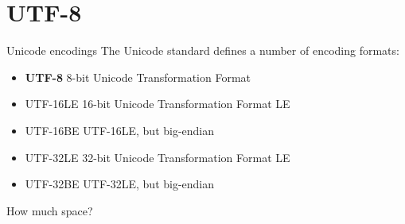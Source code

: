 \documentclass[../index.tex]{subfiles}
\begin{document}
\section{UTF-8}
%

\renewcommand{\currenttitle}{Unicode encodings}
\begin{frame}{\currenttitle}
%
%
%
%
  The Unicode standard defines a number of encoding formats:

  \begin{itemize}
    \item \textbf{UTF-8} \textendash{} 8-bit Unicode Transformation Format
    \item[] UTF-16LE \textendash{} 16-bit Unicode Transformation Format LE
    \item[] UTF-16BE \textendash{} UTF-16LE, but big-endian
    \item[] UTF-32LE \textendash{} 32-bit Unicode Transformation Format LE
    \item[] UTF-32BE \textendash{} UTF-32LE, but big-endian
  \end{itemize}
\end{frame}

\renewcommand{\currenttitle}{How much space?}
\begin{frame}{\currenttitle}
%
%
\end{frame}
\end{document}
